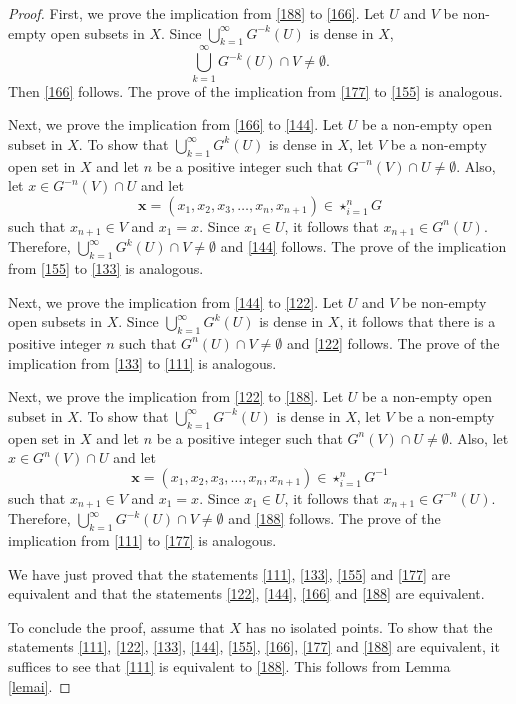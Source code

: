 \documentclass[a4paper,12pt]{article} %
\begin{document}
\begin{proof}
First, we prove the implication from \ref{188} to \ref{166}. Let $U$ and $V$ be non-empty open subsets in $X$. Since $\bigcup_{k=1}^{\infty}G^{-k}(U)$ is dense in $X$, 
$$
\bigcup_{k=1}^{\infty}G^{-k}(U)\cap V\neq \emptyset. 
$$ 
Then \ref{166} follows. The prove of the implication from \ref{177} to \ref{155} is analogous.

Next, we prove the implication from \ref{166} to \ref{144}. Let $U$ be a non-empty open subset in $X$. To show that $\bigcup_{k=1}^{\infty}G^{k}(U)$ is dense in $X$, let $V$ be a non-empty open set in $X$ and let $n$ be a positive integer such that $G^{-n}(V)\cap U\neq\emptyset$. Also, let $x\in G^{-n}(V)\cap U$ and let
$$
\mathbf x=(x_1,x_2,x_3,\ldots ,x_n,x_{n+1})\in \star_{i=1}^{n}G
$$
such that $x_{n+1}\in V$ and $x_1=x$.  Since $x_1\in U$, it follows that $x_{n+1}\in G^n(U)$. Therefore, $\bigcup_{k=1}^{\infty}G^{k}(U)\cap V\neq \emptyset$ 
and \ref{144} follows. The prove of the implication from \ref{155} to \ref{133} is analogous.

Next, we prove the implication from \ref{144} to \ref{122}. Let $U$ and $V$ be non-empty open subsets in $X$. Since $\bigcup_{k=1}^{\infty}G^{k}(U)$ is dense in $X$, it follows that there is a positive integer $n$ such that $G^{n}(U)\cap V\neq \emptyset$ and \ref{122} follows. The prove of the implication from \ref{133} to \ref{111} is analogous.

Next, we prove the implication from \ref{122} to \ref{188}. Let $U$ be a non-empty open subset in $X$. To show that $\bigcup_{k=1}^{\infty}G^{-k}(U)$ is dense in $X$, let $V$ be a non-empty open set in $X$ and let $n$ be a positive integer such that $G^{n}(V)\cap U\neq\emptyset$. Also, let $x\in G^{n}(V)\cap U$ and let
$$
\mathbf x=(x_1,x_2,x_3,\ldots ,x_n,x_{n+1})\in \star_{i=1}^{n}G^{-1}
$$
such that $x_{n+1}\in V$ and $x_1=x$.  Since $x_1\in U$, it follows that $x_{n+1}\in G^{-n}(U)$. Therefore, $\bigcup_{k=1}^{\infty}G^{-k}(U)\cap V\neq \emptyset$ 
and \ref{188} follows. The prove of the implication from \ref{111} to \ref{177} is analogous.

We have just proved that the statements \ref{111}, \ref{133}, \ref{155} and \ref{177} are equivalent and that the statements \ref{122}, \ref{144}, \ref{166} and \ref{188} are equivalent. 

To conclude the proof, assume that $X$ has no isolated points.  To show that the statements \ref{111},  \ref{122},  \ref{133},   \ref{144},  \ref{155},  \ref{166},  \ref{177} and \ref{188} are equivalent, it suffices to see that \ref{111} is equivalent to \ref{188}. This follows from Lemma \ref{lemai}.
\end{proof}
\end{document}
